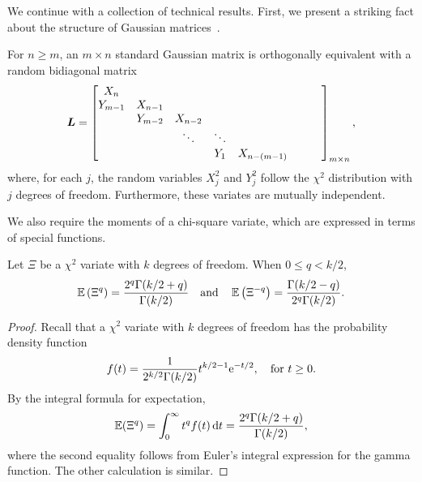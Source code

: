 \documentclass[final]{siamltex}
\begin{document}
\begin{appendix}
We continue with a collection of technical results.
First, we present a striking fact about
the structure of Gaussian matrices~\cite[\S3.5]{Ede89:Eigenvalues-Condition}.

\lsp

\begin{proposition} \label{prop:bidiag}
For $n \geq m$, an $m \times n$ standard Gaussian matrix is orthogonally equivalent with a random bidiagonal matrix
\begin{equation} \label{eqn:bidiag}
\mtx{L} =
\begin{bmatrix}
X_n \\
Y_{m-1} & X_{n-1} \\
& Y_{m-2} & X_{n-2} \\
&& \ddots & \ddots \\
&&& Y_1 & X_{n-(m-1)} &&&
\end{bmatrix}_{m \times n},
\end{equation}
where, for each $j$, the random variables $X_j^2$ and $Y_j^2$ follow the $\chi^2$
distribution with $j$ degrees of freedom.  Furthermore, these variates are mutually
independent.
\end{proposition}

\lsp

We also require the moments of a chi-square variate, which are expressed in terms of special functions.

\lsp

\begin{proposition} \label{prop:chisq-moment-exact}
Let $\Xi$ be a $\chi^2$ variate with $k$ degrees of freedom.  When $0 \leq q < k/2$,
$$
\operatorname{\mathbb{E}} \left(\Xi^q \right) = \frac{ 2^q \Gamma(k/2+q)}{\Gamma(k/2)}
\quad\text{and}\quad
\operatorname{\mathbb{E}} \left(\Xi^{-q} \right) = \frac{ \Gamma(k/2 - q)}{2^q \Gamma(k/2)}.
$$
\end{proposition}


\begin{proof}
Recall that a $\chi^2$ variate with $k$ degrees of freedom has the probability density function
$$
f(t) = \frac{1}{2^{k/2} \Gamma(k/2)} t^{k/2 - 1} \mathrm{e}^{-t/2},
    \quad\text{for $t \geq 0$}.
$$
By the integral formula for expectation,
$$
\operatorname{\mathbb{E}}(\Xi^q) = \int_0^{\infty} t^q f(t)\, \mathrm{d}{t}
    = \frac{ 2^q \Gamma(k/2+q)}{\Gamma(k/2)},
$$
where the second equality follows from Euler's integral expression for the gamma function.  The other calculation is similar.
\end{proof}


\end{appendix}
\end{document}
